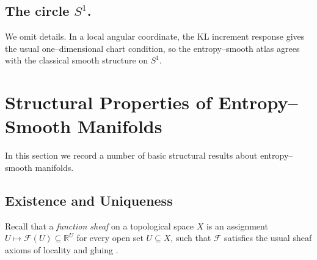 \documentclass[11pt]{amsart}
\theoremstyle{definition}
\theoremstyle{remark}
\begin{document}
\subsection{The circle $S^1$.}
We omit details. In a local angular coordinate, the KL increment response gives the usual one--dimensional chart condition, so the entropy--smooth atlas agrees with the classical smooth structure on $S^1$.


\section{Structural Properties of Entropy--Smooth Manifolds}

In this section we record a number of basic structural results about
entropy--smooth manifolds. 
\subsection{Existence and Uniqueness}
Recall that a \emph{function sheaf} on a topological space $X$ is an assignment 
$U\mapsto \mathcal{F}(U)\subseteq \mathbb{R}^U$ for every open set 
$U\subseteq X$, such that $\mathcal{F}$ satisfies the usual sheaf 
axioms of locality and gluing \cite{moerdijk2003models}.
\end{document}

